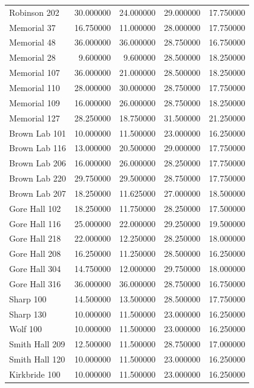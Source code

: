 \documentclass[conference]{IEEEtran}
\begin{document}
\begin{tabular}{l|r|r|r|r}
    Robinson 202 & 30.000000 & 24.000000 & 29.000000 & 17.750000 \\
    Memorial 37 & 16.750000 & 11.000000 & 28.000000 & 17.750000 \\
    Memorial 48 & 36.000000 & 36.000000 & 28.750000 & 16.750000 \\
    Memorial 28 & 9.600000 & 9.600000 & 28.500000 & 18.250000 \\
    Memorial 107 & 36.000000 & 21.000000 & 28.500000 & 18.250000 \\
    Memorial 110 & 28.000000 & 30.000000 & 28.750000 & 17.750000 \\
    Memorial 109 & 16.000000 & 26.000000 & 28.750000 & 18.250000 \\
    Memorial 127 & 28.250000 & 18.750000 & 31.500000 & 21.250000 \\
    Brown Lab 101 & 10.000000 & 11.500000 & 23.000000 & 16.250000 \\
    Brown Lab 116 & 13.000000 & 20.500000 & 29.000000 & 17.750000 \\
    Brown Lab 206 & 16.000000 & 26.000000 & 28.250000 & 17.750000 \\
    Brown Lab 220 & 29.750000 & 29.500000 & 28.750000 & 17.750000 \\
    Brown Lab 207 & 18.250000 & 11.625000 & 27.000000 & 18.500000 \\
    Gore Hall 102 & 18.250000 & 11.750000 & 28.250000 & 17.500000 \\
    Gore Hall 116 & 25.000000 & 22.000000 & 29.250000 & 19.500000 \\
    Gore Hall 218 & 22.000000 & 12.250000 & 28.250000 & 18.000000 \\
    Gore Hall 208 & 16.250000 & 11.250000 & 28.500000 & 16.250000 \\
    Gore Hall 304 & 14.750000 & 12.000000 & 29.750000 & 18.000000 \\
    Gore Hall 316 & 36.000000 & 36.000000 & 28.750000 & 16.750000 \\
    Sharp 100 & 14.500000 & 13.500000 & 28.500000 & 17.750000 \\
    Sharp 130 & 10.000000 & 11.500000 & 23.000000 & 16.250000 \\
    Wolf 100 & 10.000000 & 11.500000 & 23.000000 & 16.250000 \\
    Smith Hall 209 & 12.500000 & 11.500000 & 28.750000 & 17.000000 \\
    Smith Hall 120 & 10.000000 & 11.500000 & 23.000000 & 16.250000 \\
    Kirkbride 100 & 10.000000 & 11.500000 & 23.000000 & 16.250000 \\

\end{tabular}
\end{document}
